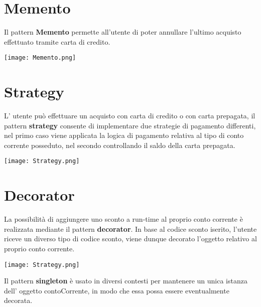 \section{Memento}
Il pattern \textbf{Memento} permette all'utente di poter annullare l'ultimo acquisto effettuato tramite carta di credito. \\
\begin{center}
\texttt{[image: Memento.png]}
\end{center}

\section{Strategy}
L' utente pu\`{o} effettuare un acquisto con carta di credito o con carta prepagata, il pattern \textbf{strategy} consente di implementare due strategie di pagamento differenti, nel primo caso viene applicata la logica di pagamento relativa al tipo di conto corrente posseduto, nel secondo controllando il saldo della carta prepagata.\\
\begin{center}
\texttt{[image: Strategy.png]}
\end{center}

\section{Decorator}
La possibilit\`{a} di aggiungere uno sconto a run-time al proprio conto corrente \`{e} realizzata mediante il pattern \textbf{decorator}. In base al codice sconto iserito, l'utente riceve un diverso tipo di codice sconto, viene dunque decorato l'oggetto relativo al proprio conto corrente.\\
\begin{center}
\texttt{[image: Strategy.png]}
\end{center}

Il pattern \textbf{singleton} \`{e} usato in diversi contesti per mantenere un unica istanza dell' oggetto contoCorrente, in modo che essa possa essere eventualmente decorata.\\

 